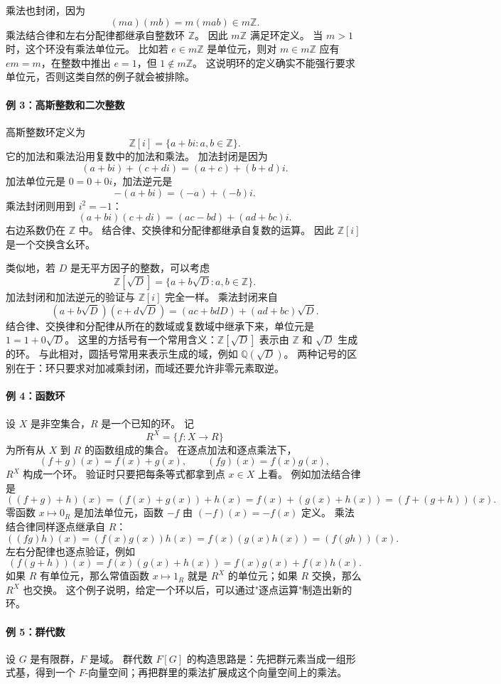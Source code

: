 乘法也封闭，因为
\[
(ma)(mb)=m(mab)\in m\mathbb Z.
\]
乘法结合律和左右分配律都继承自整数环 $\mathbb Z$。
因此 $m\mathbb Z$ 满足环定义。
当 $m>1$ 时，这个环没有乘法单位元。
比如若 $e\in m\mathbb Z$ 是单位元，则对 $m\in m\mathbb Z$ 应有 $em=m$，在整数中推出 $e=1$，但 $1\notin m\mathbb Z$。
这说明环的定义确实不能强行要求单位元，否则这类自然的例子就会被排除。

\paragraph*{例 3：高斯整数和二次整数}
高斯整数环定义为
\[
\mathbb Z[i]=\{a+bi:a,b\in\mathbb Z\}.
\]
它的加法和乘法沿用复数中的加法和乘法。
加法封闭是因为
\[
(a+bi)+(c+di)=(a+c)+(b+d)i.
\]
加法单位元是 $0=0+0i$，加法逆元是
\[
-(a+bi)=(-a)+(-b)i.
\]
乘法封闭则用到 $i^2=-1$：
\[
(a+bi)(c+di)=(ac-bd)+(ad+bc)i.
\]
右边系数仍在 $\mathbb Z$ 中。
结合律、交换律和分配律都继承自复数的运算。
因此 $\mathbb Z[i]$ 是一个交换含幺环。

类似地，若 $D$ 是无平方因子的整数，可以考虑
\[
\mathbb Z[\sqrt D]=\{a+b\sqrt D:a,b\in\mathbb Z\}.
\]
加法封闭和加法逆元的验证与 $\mathbb Z[i]$ 完全一样。
乘法封闭来自
\[
(a+b\sqrt D)(c+d\sqrt D)=(ac+bdD)+(ad+bc)\sqrt D.
\]
结合律、交换律和分配律从所在的数域或复数域中继承下来，单位元是 $1=1+0\sqrt D$。
这里的方括号有一个常用含义：$\mathbb Z[\sqrt D]$ 表示由 $\mathbb Z$ 和 $\sqrt D$ 生成的环。
与此相对，圆括号常用来表示生成的域，例如 $\mathbb Q(\sqrt D)$。
两种记号的区别在于：环只要求对加减乘封闭，而域还要允许非零元素取逆。

\paragraph*{例 4：函数环}
设 $X$ 是非空集合，$R$ 是一个已知的环。
记
\[
R^X=\{f:X\to R\}
\]
为所有从 $X$ 到 $R$ 的函数组成的集合。
在逐点加法和逐点乘法下，
\[
(f+g)(x)=f(x)+g(x),\qquad (fg)(x)=f(x)g(x),
\]
$R^X$ 构成一个环。
验证时只要把每条等式都拿到点 $x\in X$ 上看。
例如加法结合律是
\[
((f+g)+h)(x)=(f(x)+g(x))+h(x)=f(x)+(g(x)+h(x))=(f+(g+h))(x).
\]
零函数 $x\mapsto0_R$ 是加法单位元，函数 $-f$ 由 $(-f)(x)=-f(x)$ 定义。
乘法结合律同样逐点继承自 $R$：
\[
((fg)h)(x)=(f(x)g(x))h(x)=f(x)(g(x)h(x))=(f(gh))(x).
\]
左右分配律也逐点验证，例如
\[
(f(g+h))(x)=f(x)(g(x)+h(x))=f(x)g(x)+f(x)h(x).
\]
如果 $R$ 有单位元，那么常值函数 $x\mapsto 1_R$ 就是 $R^X$ 的单位元；如果 $R$ 交换，那么 $R^X$ 也交换。
这个例子说明，给定一个环以后，可以通过"逐点运算"制造出新的环。

\paragraph*{例 5：群代数}
设 $G$ 是有限群，$F$ 是域。
群代数 $F[G]$ 的构造思路是：先把群元素当成一组形式基，得到一个 $F$-向量空间；再把群里的乘法扩展成这个向量空间上的乘法。

